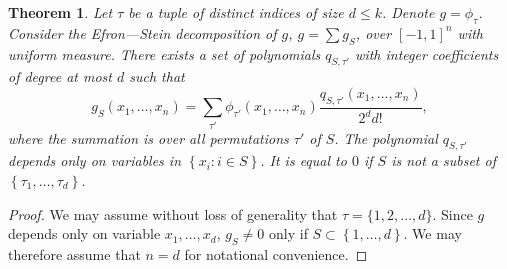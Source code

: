 \documentclass[11pt]{article}
\newif\ifconf
\newcommand {\set}   [1] {\left\{ #1 \right\}}
\newtheorem{theorem}{Theorem}
\begin{document}
\ifconf\pagebreak\fi
\begin{theorem}\label{thm:ES-ordering-predicate}
Let $\tau$ be a tuple of distinct indices of size $d \leq k$. Denote $g=\phi_{\tau}$. Consider the Efron---Stein decomposition of $g$, $g = \sum g_S$, over $[-1,1]^n$ with uniform measure.
There exists a set of polynomials $q_{S,\tau'}$ with integer coefficients of degree at most $d$ such that
$$g_S(x_1,\dots, x_n) = \sum_{\tau'}
\phi_{\tau'}(x_1,\dots, x_n) \frac{q_{S,\tau'}(x_1,\dots, x_n)}{2^{d} d!},$$
where the summation is over all permutations $\tau'$ of $S$. The polynomial $q_{S,\tau'}$ depends only on variables in $\set{x_i:i\in S}$. It is equal to $0$ if
$S$ is not a subset of $\set{\tau_1,\dots,\tau_d}$.
\end{theorem}
\begin{proof}
We may assume without loss of generality that
$\tau=\{1,2,\dots, d\}$.
Since $g$ depends only on
variable $x_1,\dots, x_d$, $g_S \neq 0$ only if $S \subset \set{1,\dots, d}$. We may therefore assume that $n = d$
for notational convenience.


\end{proof}
\end{document}
